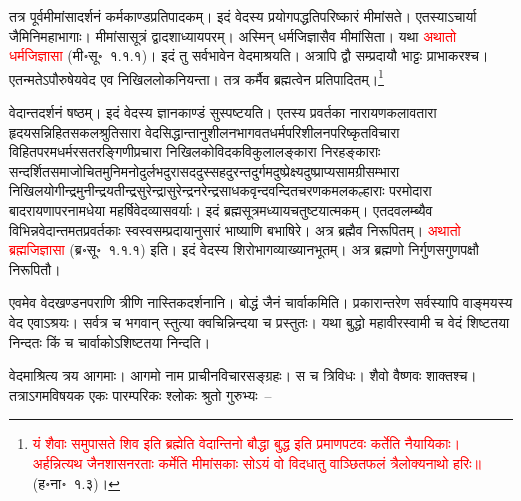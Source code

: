 \begin{sloppypar}\justifying\noindent\hspace{10mm} तत्र पूर्व\-मीमांसा\-दर्शनं कर्म\-काण्ड\-प्रतिपादकम्। इदं वेदस्य प्रयोग\-पद्धति\-परिष्कारं मीमांसते। एतस्याऽचार्या जैमिनि\-महाभागाः। मीमांसा\-सूत्रं द्वादशाध्याय\-परम्। अस्मिन् धर्म\-जिज्ञासैव मीमांसिता। यथा \textcolor{red}{अथातो धर्मजिज्ञासा} (मी॰सू॰~१.१.१)। इदं तु सर्वभावेन वेदमाश्रयति। अत्रापि द्वौ सम्प्रदायौ भाट्टः प्राभाकरश्च। एतन्मतेऽपौरुषेयवेद एव निखिल\-लोक\-नियन्ता। तत्र कर्मैव ब्रह्मत्वेन प्रतिपादितम्।\footnote{\textcolor{red}{यं शैवाः समुपासते शिव इति ब्रह्मेति वेदान्तिनो बौद्धा बुद्ध इति प्रमाणपटवः कर्तेति नैयायिकाः। अर्हन्नित्यथ जैनशासनरताः कर्मेति मीमांसकाः सोऽयं वो विदधातु वाञ्छितफलं त्रैलोक्यनाथो हरिः॥} (ह॰ना॰~१.३)।}\end{sloppypar}
\begin{sloppypar}\justifying\noindent\hspace{10mm} वेदान्त\-दर्शनं षष्ठम्। इदं वेदस्य ज्ञानकाण्डं सुस्पष्टयति। एतस्य प्रवर्तका नारायण\-कलावतारा हृदय\-सन्निहित\-सकल\-श्रुति\-सारा वेद\-सिद्धान्तानुशीलन\-भागवत\-धर्म\-परिशीलन\-परिष्कृत\-विचारा विहित\-परम\-धर्म\-रस\-तरङ्गिणी\-प्रचारा निखिल\-कोविद\-कवि\-कुलालङ्कारा निरहङ्काराः सन्दर्शित\-समाजोचित\-मुनि\-मनो\-दुर्लभ\-दुरासद\-दुस्सह\-दुरन्त\-दुर्गम\-दुष्प्रेक्ष्य\-दुष्प्राप्य\-सामग्री\-सम्भारा निखिल\-योगीन्द्र\-मुनीन्द्र\-यतीन्द्र\-सुरेन्द्रासुरेन्द्र\-नरेन्द्र\-साधक\-वृन्दवन्दित\-चरण\-कमल\-कल्हाराः परमोदारा बादरायणापर\-नामधेया महर्षि\-वेद\-व्यास\-वर्याः। इदं ब्रह्मसूत्रमध्याय\-चतुष्टयात्मकम्। एतदवलम्ब्यैव विभिन्न\-वेदान्त\-मत\-प्रवर्तकाः स्व\-स्व\-सम्प्रदायानुसारं भाष्याणि बभाषिरे। अत्र ब्रह्मैव निरूपितम्। \textcolor{red}{अथातो ब्रह्म\-जिज्ञासा} (ब्र॰सू॰~१.१.१) इति। इदं वेदस्य शिरोभागव्याख्यानभूतम्। अत्र ब्रह्मणो निर्गुण\-सगुण\-पक्षौ निरूपितौ। \end{sloppypar}
\begin{sloppypar}\justifying\noindent\hspace{10mm} एवमेव वेदखण्डन\-पराणि त्रीणि नास्तिक\-दर्शनानि। बोद्धं जैनं चार्वाकमिति। प्रकारान्तरेण सर्वस्यापि वाङ्मयस्य वेद एवाऽश्रयः। सर्वत्र च भगवान् स्तुत्या क्वचिन्निन्दया च प्रस्तुतः। यथा बुद्धो महावीर\-स्वामी च वेदं शिष्टतया निन्दतः किं च चार्वाकोऽशिष्टतया निन्दति।\end{sloppypar}
\begin{sloppypar}\justifying\noindent\hspace{10mm} वेदमाश्रित्य त्रय आगमाः। आगमो नाम प्राचीन\-विचार\-सङ्ग्रहः। स च त्रिविधः। शैवो वैष्णवः शाक्तश्च। तत्राऽगम\-विषयक एकः पारम्परिकः श्लोकः श्रुतो गुरुभ्यः~–\end{sloppypar}
